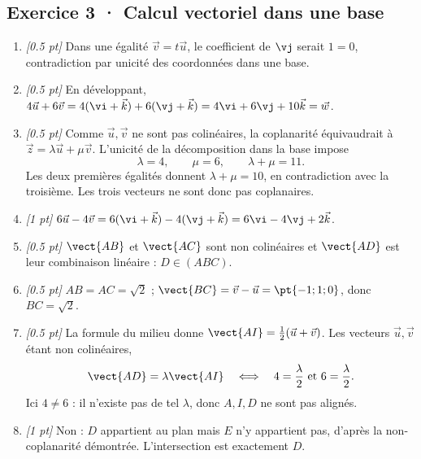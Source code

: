 \subsection*{Exercice 3 · Calcul vectoriel dans une base}\begin{enumerate}

\item \textit{[\num{0,5} pt]} Dans une égalité $\vec v=t\vec u$, le coefficient de $\vj $ serait $1=0$, contradiction par unicité des coordonnées dans une base.

\item \textit{[\num{0,5} pt]} En développant, $4\vec u+6\vec v=4(\vi +\vec k)+6(\vj +\vec k)=4\vi +6\vj +10\vec k=\vec w$.

\item \textit{[\num{0,5} pt]} Comme $\vec u,\vec v$ ne sont pas colinéaires, la coplanarité équivaudrait à $\vec z=\lambda\vec u+\mu\vec v$. L'unicité de la décomposition dans la base impose
\[\lambda=4,\qquad\mu=6,\qquad\lambda+\mu=11.\]
Les deux premières égalités donnent $\lambda+\mu=10$, en contradiction avec la troisième. Les trois vecteurs ne sont donc pas coplanaires.

\item \textit{[1 pt]} $6\vec u-4\vec v=6(\vi +\vec k)-4(\vj +\vec k)=6\vi -4\vj +2\vec k$.

\item \textit{[\num{0,5} pt]} $\vect{AB}$ et $\vect{AC}$ sont non colinéaires et $\vect{AD}$ est leur combinaison linéaire : $D\in(ABC)$.

\item \textit{[\num{0,5} pt]} $AB=AC=\sqrt2$ ; $\vect{BC}=\vec v-\vec u=\pt{-1;1;0}$, donc $BC=\sqrt2$.

\item \textit{[\num{0,5} pt]} La formule du milieu donne $\vect{AI}=\frac12(\vec u+\vec v)$. Les vecteurs $\vec u,\vec v$ étant non colinéaires,
\[\vect{AD}=\lambda\vect{AI}\quad\Longleftrightarrow\quad 4=\frac{\lambda}{2}\ \text{et}\ 6=\frac{\lambda}{2}.\]
Ici $4\ne 6$ : il n'existe pas de tel $\lambda$, donc $A,I,D$ ne sont pas alignés.

\item \textit{[1 pt]} Non : $D$ appartient au plan mais $E$ n'y appartient pas, d'après la non-coplanarité démontrée. L'intersection est exactement $D$.

\end{enumerate}

